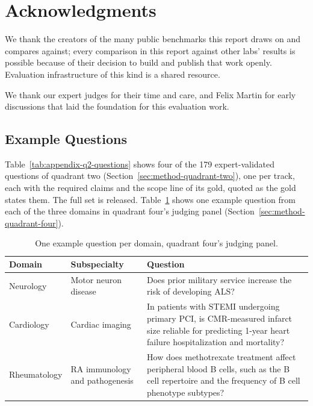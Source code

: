 \documentclass[sn-mathphys,Numbered]{sn-jnl}%
\begin{document}
\section{Acknowledgments}\label{sec:thanks}

We thank the creators of the many public benchmarks this report draws on and
compares against; every comparison in this report against other labs' results
is possible because of their decision to build and publish that work openly.
Evaluation infrastructure of this kind is a shared resource.

We thank our expert judges for their time and care, and Felix Martin for early
discussions that laid the foundation for this evaluation work.

\begin{appendices}

\section{Example Questions}\label{sec:appendix-questions}

Table~\ref{tab:appendix-q2-questions} shows four of the 179 expert-validated questions
of quadrant two (Section~\ref{sec:method-quadrant-two}), one per track, each with the
required claims and the scope line of its gold, quoted as the gold states them. The full
set is released. Table~\ref{tab:appendix-questions} shows one example question from each
of the three domains in quadrant four's judging panel
(Section~\ref{sec:method-quadrant-four}).

\begin{table}[h]
\caption{One example question per domain, quadrant four's judging panel.}
\label{tab:appendix-questions}
\begin{tabularx}{\textwidth}{@{}llX@{}}
\toprule
\textbf{Domain} & \textbf{Subspecialty} & \textbf{Question} \\
\midrule
Neurology & Motor neuron disease & Does prior military service increase the risk
of developing ALS? \\[0.6em]
Cardiology & Cardiac imaging & In patients with STEMI undergoing primary PCI, is
CMR-measured infarct size reliable for predicting 1-year heart failure
hospitalization and mortality? \\[0.6em]
Rheumatology & RA immunology and pathogenesis & How does methotrexate treatment
affect peripheral blood B cells, such as the B cell repertoire and the frequency
of B cell phenotype subtypes? \\
\bottomrule
\end{tabularx}
\end{table}


\end{appendices}
\end{document}
